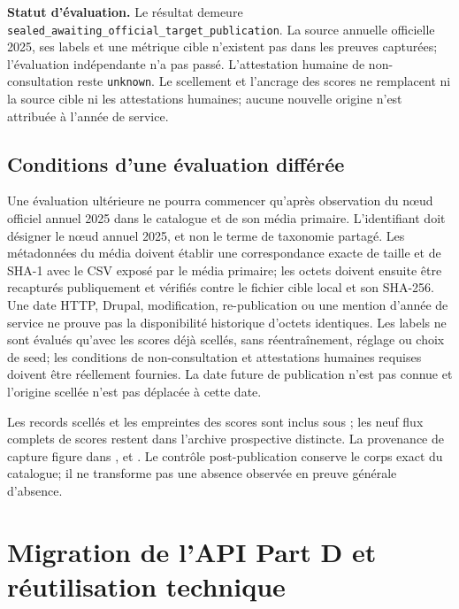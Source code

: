 \textbf{Statut d'évaluation.} Le résultat demeure \texttt{sealed\_awaiting\_official\_target\_publication}. La source annuelle officielle 2025, ses labels et une métrique cible n'existent pas dans les preuves capturées; l'évaluation indépendante n'a pas passé. L'attestation humaine de non-consultation reste \texttt{unknown}. Le scellement et l'ancrage des scores ne remplacent ni la source cible ni les attestations humaines; aucune nouvelle origine n'est attribuée à l'année de service.

\subsection{Conditions d'une évaluation différée}

Une évaluation ultérieure ne pourra commencer qu'après observation du nœud officiel annuel 2025 dans le catalogue et de son média primaire. L'identifiant doit désigner le nœud annuel 2025, et non le terme de taxonomie partagé. Les métadonnées du média doivent établir une correspondance exacte de taille et de SHA-1 avec le CSV exposé par le média primaire; les octets doivent ensuite être recapturés publiquement et vérifiés contre le fichier cible local et son SHA-256. Une date HTTP, Drupal, modification, re-publication ou une mention d'année de service ne prouve pas la disponibilité historique d'octets identiques. Les labels ne sont évalués qu'avec les scores déjà scellés, sans réentraînement, réglage ou choix de seed; les conditions de non-consultation et attestations humaines requises doivent être réellement fournies. La date future de publication n'est pas connue et l'origine scellée n'est pas déplacée à cette date.

Les records scellés et les empreintes des scores sont inclus sous ; les neuf flux complets de scores restent dans l'archive prospective distincte. La provenance de capture figure dans ,  et . Le contrôle post-publication conserve le corps exact du catalogue; il ne transforme pas une absence observée en preuve générale d'absence.

\par{}
\section{Migration de l'API Part D et réutilisation technique}
\label{supp:q2-reuse}

